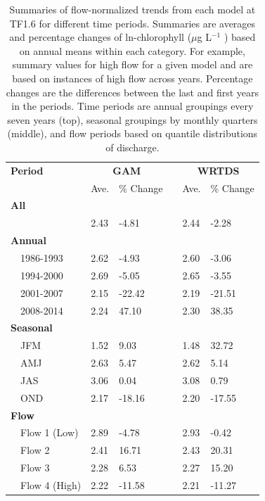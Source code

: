 \documentclass[letterpaper,12pt,oneside]{article}\usepackage[]{graphicx}\usepackage[]{color}
\newcommand{\mugl}{$\mu$g L$^{-1}$ }
\begin{document}
\begin{table}[!tbp]
\caption{Summaries of flow-normalized trends from each model at TF1.6 for different time periods.  Summaries are averages and percentage changes of ln-chlorophyll (\mugl) based on annual means within each category.  For example, summary values for high flow for a given model and are based on instances of high flow across years.  Percentage changes are the differences between the last and first years in the periods.  Time periods are annual groupings every seven years (top), seasonal groupings by monthly quarters (middle), and flow periods based on quantile distributions of discharge.\label{tab:trendsTF16}} 
\begin{center}
\begin{tabular}{lllcll}
\hline\hline
\multicolumn{1}{l}{\bfseries Period}&\multicolumn{2}{c}{\bfseries GAM}&\multicolumn{1}{c}{\bfseries }&\multicolumn{2}{c}{\bfseries WRTDS}\tabularnewline
\cline{2-3} \cline{5-6}
\multicolumn{1}{l}{}&\multicolumn{1}{c}{Ave.}&\multicolumn{1}{c}{\% Change}&\multicolumn{1}{c}{}&\multicolumn{1}{c}{Ave.}&\multicolumn{1}{c}{\% Change}\tabularnewline
\hline
{\bfseries All}&&&&&\tabularnewline
~~&2.43& -4.81&&2.44& -2.28\tabularnewline
\hline
{\bfseries Annual}&&&&&\tabularnewline
~~1986-1993&2.62& -4.93&&2.60& -3.06\tabularnewline
~~1994-2000&2.69& -5.05&&2.65& -3.55\tabularnewline
~~2001-2007&2.15&-22.42&&2.19&-21.51\tabularnewline
~~2008-2014&2.24& 47.10&&2.30& 38.35\tabularnewline
\hline
{\bfseries Seasonal}&&&&&\tabularnewline
~~JFM&1.52&  9.03&&1.48& 32.72\tabularnewline
~~AMJ&2.63&  5.47&&2.62&  5.14\tabularnewline
~~JAS&3.06&  0.04&&3.08&  0.79\tabularnewline
~~OND&2.17&-18.16&&2.20&-17.55\tabularnewline
\hline
{\bfseries Flow}&&&&&\tabularnewline
~~Flow 1 (Low)&2.89& -4.78&&2.93& -0.42\tabularnewline
~~Flow 2&2.41& 16.71&&2.43& 20.31\tabularnewline
~~Flow 3&2.28&  6.53&&2.27& 15.20\tabularnewline
~~Flow 4 (High)&2.22&-11.58&&2.21&-11.27\tabularnewline
\hline
\end{tabular}\end{center}

\end{table}
\end{document}
